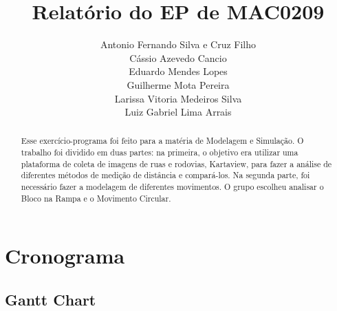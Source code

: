 \documentclass{article}
\title{Relatório do EP de MAC0209}
\author{
    Antonio Fernando Silva e Cruz Filho\\
    Cássio Azevedo Cancio\\
    Eduardo Mendes Lopes\\
    Guilherme Mota Pereira\\
    Larissa Vitoria Medeiros Silva\\
    Luiz Gabriel Lima Arrais
}
\begin{document}
\maketitle


\begin{abstract}
\quad Esse exercício-programa foi feito para a matéria de Modelagem e Simulação. O trabalho foi dividido em duas partes: na primeira, o objetivo era utilizar uma plataforma de coleta de imagens de ruas e rodovias, Kartaview, para fazer a análise de diferentes métodos de medição de distância e compará-los. Na segunda parte, foi necessário fazer a modelagem de diferentes movimentos. O grupo escolheu analisar o Bloco na Rampa e o Movimento Circular.
\end{abstract}

\newpage

\tableofcontents

\newpage

\section{Cronograma}

\subsection{Gantt Chart}
\end{document}
